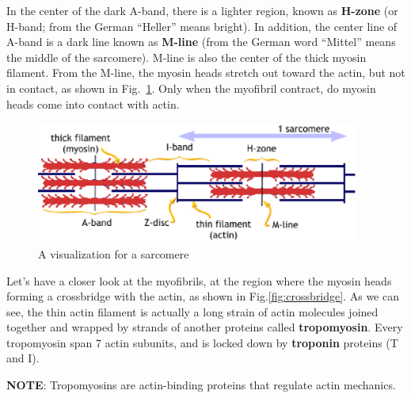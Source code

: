 In the center of the dark A-band, there is a lighter region, known as
{\bf H-zone} (or H-band; from the German ``Heller'' means bright). In
addition, the center line of A-band is a dark line known as
{\bf M-line} (from the German word ``Mittel'' means the middle of the
sarcomere). M-line is also
the center of the thick myosin filament. From the M-line, the myosin
heads stretch out toward the actin, but not in contact, as shown in
Fig.~\ref{fig:sarcomere_structure}. Only when the myofibril contract,
do myosin heads come into contact with actin.

\begin{figure}[htb]
  \centerline{\includegraphics[height=4cm]{./images/sarcomere_2.eps}}
  \caption{A visualization for a sarcomere}\label{fig:sarcomere_structure}
\end{figure}


Let's have a closer look at the myofibrils, at the region where the
myosin heads forming a crossbridge with the actin, as shown in
Fig.\ref{fig:crossbridge}. As we can see, the thin actin filament is
actually a long strain of actin molecules joined together and wrapped
by strands of another proteins called {\bf tropomyosin}. Every
tropomyosin span 7 actin subunits, and is locked down by
{\bf troponin} proteins (T and I).

{\bf NOTE}: Tropomyosins are actin-binding proteins that regulate
actin mechanics.

